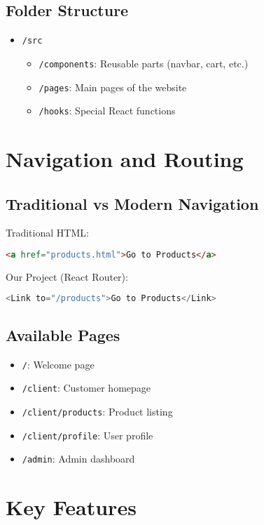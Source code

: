 \documentclass{article}
\begin{document}
\subsection{Folder Structure}
\begin{itemize}
    \item \texttt{/src}
    \begin{itemize}
        \item \texttt{/components}: Reusable parts (navbar, cart, etc.)
        \item \texttt{/pages}: Main pages of the website
        \item \texttt{/hooks}: Special React functions
    \end{itemize}
\end{itemize}

\section{Navigation and Routing}
\subsection{Traditional vs Modern Navigation}
Traditional HTML:
\begin{lstlisting}[language=HTML]
<a href="products.html">Go to Products</a>
\end{lstlisting}

Our Project (React Router):
\begin{lstlisting}[language=JavaScript]
<Link to="/products">Go to Products</Link>
\end{lstlisting}

\subsection{Available Pages}
\begin{itemize}
    \item \texttt{/}: Welcome page
    \item \texttt{/client}: Customer homepage
    \item \texttt{/client/products}: Product listing
    \item \texttt{/client/profile}: User profile
    \item \texttt{/admin}: Admin dashboard
\end{itemize}

\section{Key Features}
\end{document}
